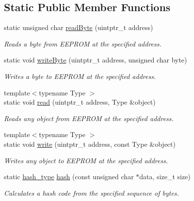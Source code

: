 \subsection*{Static Public Member Functions}
\begin{DoxyCompactItemize}
\item 
static unsigned char \mbox{\hyperlink{classArduboy2EEPROM_aec3f9eea5f4adc592da921df2ae7ba2d}{read\+Byte}} (uintptr\+\_\+t address)
\begin{DoxyCompactList}\small\item\em Reads a byte from E\+E\+P\+R\+OM at the specified address. \end{DoxyCompactList}\item 
static void \mbox{\hyperlink{classArduboy2EEPROM_a104991fb0112413980ee163aaa14d891}{write\+Byte}} (uintptr\+\_\+t address, unsigned char byte)
\begin{DoxyCompactList}\small\item\em Writes a byte to E\+E\+P\+R\+OM at the specified address. \end{DoxyCompactList}\item 
{\footnotesize template$<$typename Type $>$ }\\static void \mbox{\hyperlink{classArduboy2EEPROM_a6e9b09f0b94295c040204ca0cb674649}{read}} (uintptr\+\_\+t address, Type \&object)
\begin{DoxyCompactList}\small\item\em Reads any object from E\+E\+P\+R\+OM at the specified address. \end{DoxyCompactList}\item 
{\footnotesize template$<$typename Type $>$ }\\static void \mbox{\hyperlink{classArduboy2EEPROM_abf7be1f27f4815de59257210dac8c9eb}{write}} (uintptr\+\_\+t address, const Type \&object)
\begin{DoxyCompactList}\small\item\em Writes any object to E\+E\+P\+R\+OM at the specified address. \end{DoxyCompactList}\item 
static \mbox{\hyperlink{classArduboy2EEPROM_a6221853153af216c0d6087f1e1455cd7}{hash\+\_\+type}} \mbox{\hyperlink{classArduboy2EEPROM_a0d81ac363020a75a0b56af7eb014f5b4}{hash}} (const unsigned char $\ast$data, size\+\_\+t size)
\begin{DoxyCompactList}\small\item\em Calculates a hash code from the specified sequence of bytes. \end{DoxyCompactList}\item 

\end{DoxyCompactItemize}
